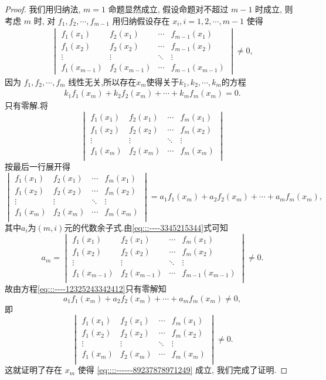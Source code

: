 \documentclass[../../main.tex]{subfiles}
\begin{document}
\begin{proof}
我们用归纳法, \( m = 1 \) 命题显然成立, 假设命题对不超过 \( m - 1 \) 时成立, 则考虑 \( m \) 时, 对 \( f_1, f_2, \cdots, f_{m - 1} \) 用归纳假设存在 \( x_i, i = 1, 2, \cdots, m - 1 \) 使得
\begin{align}\label{eq:::----3345215344}
\begin{vmatrix}
f_1(x_1) & f_2(x_1) & \cdots & f_{m - 1}(x_1) \\
f_1(x_2) & f_2(x_2) & \cdots & f_{m - 1}(x_2) \\
\vdots & \vdots & \ddots & \vdots \\
f_1(x_{m - 1}) & f_2(x_{m - 1}) & \cdots & f_{m - 1}(x_{m - 1})
\end{vmatrix} \neq 0,
\end{align}
因为 \( f_1, f_2, \cdots, f_m \) 线性无关,所以存在$x_m$使得关于$k_1,k_2,\cdots,k_m$的方程
\begin{align}\label{eq:::----12325243342412}
k_1f_1\left( x_m \right) +k_2f_2\left( x_m \right) +\cdots +k_mf_m\left( x_m \right) =0.
\end{align}
只有零解.将
\[
\begin{vmatrix}
f_1(x_1)&f_2(x_1)&\cdots&f_m(x_1)\\
f_1(x_2)&f_2(x_2)&\cdots&f_m(x_2)\\
\vdots&\vdots&\ddots&\vdots\\
f_1(x_m)&f_2(x_m)&\cdots&f_m(x_m)\\
\end{vmatrix}
\]
按最后一行展开得
\[
\begin{vmatrix}
f_1(x_1)&f_2(x_1)&\cdots&f_m(x_1)\\
f_1(x_2)&f_2(x_2)&\cdots&f_m(x_2)\\
\vdots&\vdots&\ddots&\vdots\\
f_1(x_m)&f_2(x_m)&\cdots&f_m(x_m)\\
\end{vmatrix}=a_1f_1(x_m)+a_2f_2(x_m)+\cdots+a_mf_m(x_m),
\]
其中$a_i$为$(m,i)$元的代数余子式.由\eqref{eq:::----3345215344}式可知
\[
a_m=\begin{vmatrix}
f_1(x_1)&f_2(x_1)&\cdots&f_m(x_1)\\
f_1(x_2)&f_2(x_2)&\cdots&f_m(x_2)\\
\vdots&\vdots&\ddots&\vdots\\
f_1(x_{m-1})&f_2(x_{m-1})&\cdots&f_{m-1}(x_{m-1})\\
\end{vmatrix}\ne 0.
\]
故由方程\eqref{eq:::----12325243342412}只有零解知
\[
a_1f_1(x_m)+a_2f_2(x_m)+\cdots+a_mf_m(x_m)\ne 0,
\]
即
\[
\begin{vmatrix}
f_1(x_1)&f_2(x_1)&\cdots&f_m(x_1)\\
f_1(x_2)&f_2(x_2)&\cdots&f_m(x_2)\\
\vdots&\vdots&\ddots&\vdots\\
f_1(x_m)&f_2(x_m)&\cdots&f_m(x_m)\\
\end{vmatrix}\ne 0.
\]
这就证明了存在 \( x_m \) 使得 \eqref{eq::::------89237878971249} 成立, 我们完成了证明.
\end{proof}
\end{document}
